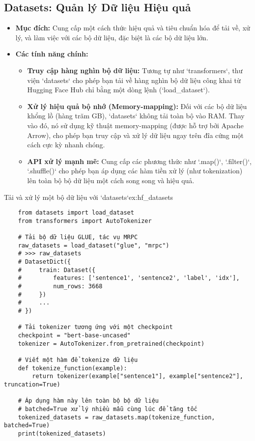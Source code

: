 \subsection{Datasets: Quản lý Dữ liệu Hiệu quả}
\label{ssec:hf_datasets}
\begin{itemize}
    \item \textbf{Mục đích:} Cung cấp một cách thức hiệu quả và tiêu chuẩn hóa để tải về, xử lý, và làm việc với các bộ dữ liệu, đặc biệt là các bộ dữ liệu lớn.
    \item \textbf{Các tính năng chính:}
        \begin{itemize}
            \item \textbf{Truy cập hàng nghìn bộ dữ liệu:} Tương tự như `transformers`, thư viện `datasets` cho phép bạn tải về hàng nghìn bộ dữ liệu công khai từ Hugging Face Hub chỉ bằng một dòng lệnh (`load\_dataset`).
            \item \textbf{Xử lý hiệu quả bộ nhớ (Memory-mapping):} Đối với các bộ dữ liệu khổng lồ (hàng trăm GB), `datasets` không tải toàn bộ vào RAM. Thay vào đó, nó sử dụng kỹ thuật memory-mapping (được hỗ trợ bởi Apache Arrow), cho phép bạn truy cập và xử lý dữ liệu ngay trên đĩa cứng một cách cực kỳ nhanh chóng.
            \item \textbf{API xử lý mạnh mẽ:} Cung cấp các phương thức như `.map()`, `.filter()`, `.shuffle()` cho phép bạn áp dụng các hàm tiền xử lý (như tokenization) lên toàn bộ bộ dữ liệu một cách song song và hiệu quả.
        \end{itemize}
\end{itemize}

\begin{example}{Tải và xử lý một bộ dữ liệu với `datasets`}{ex:hf_datasets}
    \begin{verbatim}
    from datasets import load_dataset
    from transformers import AutoTokenizer

    # Tải bộ dữ liệu GLUE, tác vụ MRPC
    raw_datasets = load_dataset("glue", "mrpc")
    # >>> raw_datasets
    # DatasetDict({
    #     train: Dataset({
    #         features: ['sentence1', 'sentence2', 'label', 'idx'],
    #         num_rows: 3668
    #     })
    #     ...
    # })

    # Tải tokenizer tương ứng với một checkpoint
    checkpoint = "bert-base-uncased"
    tokenizer = AutoTokenizer.from_pretrained(checkpoint)

    # Viết một hàm để tokenize dữ liệu
    def tokenize_function(example):
        return tokenizer(example["sentence1"], example["sentence2"], truncation=True)

    # Áp dụng hàm này lên toàn bộ bộ dữ liệu
    # batched=True xử lý nhiều mẫu cùng lúc để tăng tốc
    tokenized_datasets = raw_datasets.map(tokenize_function, batched=True)
    print(tokenized_datasets)
    \end{verbatim}
\end{example}


